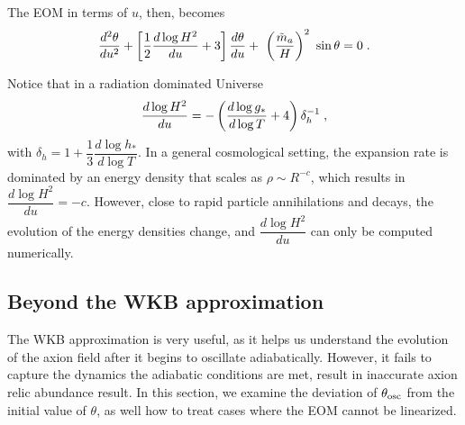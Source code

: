 \documentclass[11pt,a4paper]{article}
\begin{document}
The EOM in terms of $u$, then, becomes
%
\begin{equation}
	\dfrac{d^2  \theta}{du^2} + \left[ \dfrac{1}{2} \dfrac{d \log H^2}{du} + 3  \right] \dfrac{d  \theta}{d u} + \ \left( \dfrac{\tilde m_{a}{}}{H} \right)^2 \ \sin \theta
	=0 \;.
	\label{eq:eom_u}
\end{equation}

Notice that in a radiation dominated Universe
%
$$
\dfrac{d \log H^2}{du} = -\left(  \dfrac{d \log g_*}{d \log T} +4  \right) \delta_h^{-1}\;,
$$
with  $ \delta_h = 1+ \dfrac{1}{3} \dfrac{d \log h_*}{d \log T} $. 
%
In a general cosmological setting, the expansion rate is dominated by an energy density that scales as $\rho \sim R^{-c}$, which results in $\dfrac{d \log H^2}{du}  = -c$. However, close to rapid particle annihilations and decays, the evolution of the energy densities change, and $\dfrac{d \log H^2}{du}$ can only be computed numerically.

\subsection{Beyond the WKB approximation}\label{sec:beyond_WKB}
%
The WKB approximation is very useful, as it helps us understand the evolution of the axion field after it begins to oscillate adiabatically. However, it fails to capture the dynamics the adiabatic conditions are met, result in inaccurate axion relic abundance result. In this section, we examine the deviation of $\theta_{\rm osc}{}$ from the initial value of $\theta$, as well how to treat cases where the EOM cannot be linearized.
\end{document}
